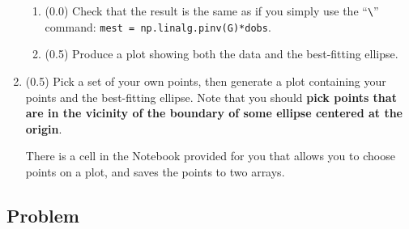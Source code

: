\documentclass[11pt,titlepage,fleqn]{article}
\begin{document}
\begin{enumerate}
\begin{enumerate}

\item (0.0) Check that the result is the same as if you simply use the ``\verb+\+'' command: \verb+mest = np.linalg.pinv(G)*dobs+.

\item (0.5) Produce a plot showing both the data and the best-fitting ellipse.

\end{enumerate}


\item (0.5) Pick a set of your own points, then generate a plot containing your points and the best-fitting ellipse. Note that you should {\bf pick points that are in the vicinity of the boundary of some ellipse centered at the origin}.

There is a cell in the Notebook provided for you that allows you to choose points on a plot, and saves the points to two arrays.


\pagebreak

\end{enumerate}


\subsection*{Problem} \howmuchtime\



\end{document}
